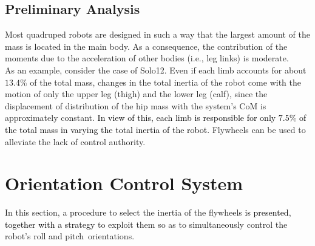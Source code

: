 \documentclass[sensors,article,accept,pdftex,moreauthors]{Definitions/mdpi}
\newcommand{\MF}[1]{\textcolor{black}{#1}}
\begin{document}
\subsection*{Preliminary Analysis}
Most quadruped robots are designed in such a way that the largest amount of the mass is located in the main body. As a consequence, the contribution of the moments due to the acceleration of other bodies (i.e., leg links) is moderate. \\
As an example, consider the case of Solo12. Even if each limb accounts for about $13.4\%$ of the total mass, changes in the total inertia of the robot come with the motion of only the upper leg (thigh) and the lower leg (calf), since the displacement of distribution of the hip mass with the system's CoM is approximately constant. \MF{In view of this, each limb is responsible for only $7.5\%$ of the total mass in varying the total inertia of the robot}. Flywheels can be used to alleviate the lack of control authority.


\section{Orientation Control System}
\label{sec:ocs}
In this section, a procedure to select the inertia of the flywheels \MF{is presented, together with a strategy} to exploit them so as to simultaneously control the robot's roll and p\mbox{itch orien}tations.
\end{document}
